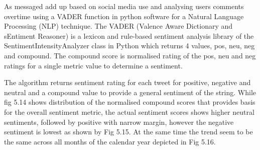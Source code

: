 As messaged add up based on social media use and analysing users comments overtime using a VADER function in python software for a Natural Language Processing (NLP) technique.  
The VADER (Valence Aware Dictionary and sEntiment Reasoner) is a lexicon and rule-based sentiment analysis library of the SentimentIntensityAnalyzer class in Python which returns 4 values, pos, neu, neg and compound.  The compound score is normalised rating of the pos, neu and neg ratings for a single metric value to determine a sentiment. 

The algorithm returns sentiment rating for each tweet for positive, negative and neutral and a compound value to provide a general sentiment of the string.  
While fig 5.14 shows distribution of the normalised compound scores that provides basis for the overall sentiment metric, the actual sentiment scores shows higher neutral sentiments, followed by positive with narrow margin, however the negative sentiment is lowest as shown by Fig 5.15.  At the same time the trend seem to be the same across all months of the calendar year depicted in Fig 5.16.\\

